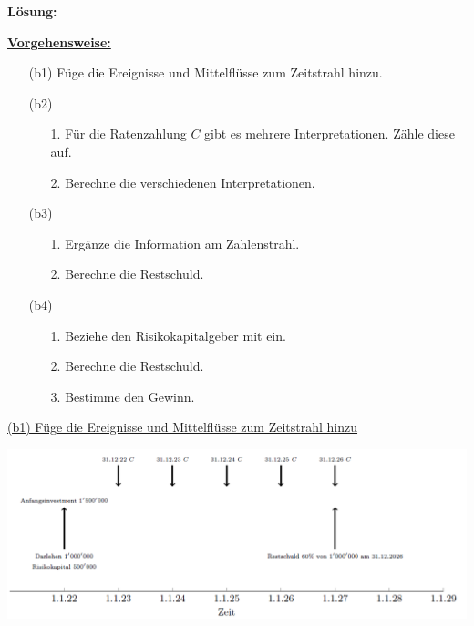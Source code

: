 \newpage
\textbf{Lösung:}
\begin{mdframed}
\underline{\textbf{Vorgehensweise:}}
\begin{enumerate}
\item[(b1)] 
Füge die Ereignisse und Mittelflüsse zum Zeitstrahl hinzu.
\item[(b2)]
\begin{enumerate}
	\item[1.] Für die Ratenzahlung $C$ gibt es mehrere Interpretationen. Zähle diese auf.
	\item[2.] 
	Berechne die verschiedenen Interpretationen.
\end{enumerate}
\item[(b3)]
\begin{enumerate}
	\item[1.] Ergänze die Information am Zahlenstrahl.
	\item[2.] 
	Berechne die Restschuld.
\end{enumerate}
\item[(b4)]
\begin{enumerate}
	\item[1.] Beziehe den Risikokapitalgeber mit ein.
	\item[2.] Berechne die Restschuld.
	\item[3.] Bestimme den Gewinn.
\end{enumerate}
\end{enumerate}
\end{mdframed}

\underline{(b1) Füge die Ereignisse und Mittelflüsse zum Zeitstrahl hinzu}\\
\begin{center}
	\includegraphics[scale=0.6]{pictures/zeitstrahl_1_b_filled_1}
\end{center}

